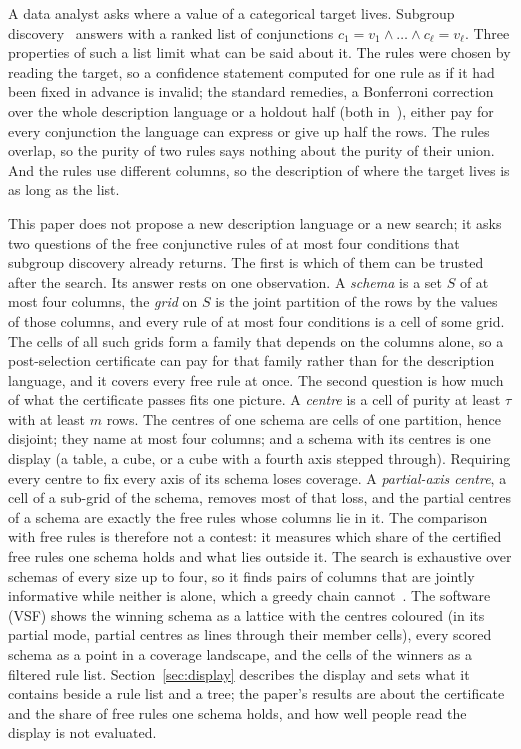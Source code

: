 \documentclass[11pt]{article}
\begin{document}
A data analyst asks where a value of a categorical target lives. Subgroup discovery~\citep{klosgen1996,wrobel1997,atzmueller2015} answers with a ranked list of conjunctions $c_1 = v_1 \wedge \dots \wedge c_\ell = v_\ell$. Three properties of such a list limit what can be said about it. The rules were chosen by reading the target, so a confidence statement computed for one rule as if it had been fixed in advance is invalid; the standard remedies, a Bonferroni correction over the whole description language or a holdout half (both in~\citealp{webb2007}), either pay for every conjunction the language can express or give up half the rows. The rules overlap, so the purity of two rules says nothing about the purity of their union. And the rules use different columns, so the description of where the target lives is as long as the list.

This paper does not propose a new description language or a new search; it asks two questions of the free conjunctive rules of at most four conditions that subgroup discovery already returns. The first is which of them can be trusted after the search. Its answer rests on one observation. A \emph{schema} is a set $S$ of at most four columns, the \emph{grid} on $S$ is the joint partition of the rows by the values of those columns, and every rule of at most four conditions is a cell of some grid. The cells of all such grids form a family that depends on the columns alone, so a post-selection certificate can pay for that family rather than for the description language, and it covers every free rule at once. The second question is how much of what the certificate passes fits one picture. A \emph{centre} is a cell of purity at least $\tau$ with at least $m$ rows. The centres of one schema are cells of one partition, hence disjoint; they name at most four columns; and a schema with its centres is one display (a table, a cube, or a cube with a fourth axis stepped through). Requiring every centre to fix every axis of its schema loses coverage. A \emph{partial-axis centre}, a cell of a sub-grid of the schema, removes most of that loss, and the partial centres of a schema are exactly the free rules whose columns lie in it. The comparison with free rules is therefore not a contest: it measures which share of the certified free rules one schema holds and what lies outside it. The search is exhaustive over schemas of every size up to four, so it finds pairs of columns that are jointly informative while neither is alone, which a greedy chain cannot~\citep{krause2005}. The software (VSF) shows the winning schema as a lattice with the centres coloured (in its partial mode, partial centres as lines through their member cells), every scored schema as a point in a coverage landscape, and the cells of the winners as a filtered rule list. Section~\ref{sec:display} describes the display and sets what it contains beside a rule list and a tree; the paper's results are about the certificate and the share of free rules one schema holds, and how well people read the display is not evaluated.
\end{document}
